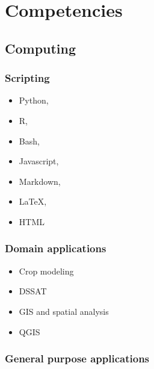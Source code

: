 \documentclass[11pt, a4paper]{awesome-cv}
\begin{document}
\hypertarget{competencies}{%
\section{Competencies}\label{competencies}}

\hypertarget{computing}{%
\subsection{Computing}\label{computing}}

\hypertarget{scripting}{%
\subsubsection*{Scripting}\label{scripting}}

\begin{multicols}{2}
\begin{itemize}
\item Python, 
\item R, 
\item Bash,
\item Javascript,
\item Markdown,
\item \LaTeX,
\item HTML
\end{itemize}
\end{multicols}

\hypertarget{domain-applications}{%
\subsubsection*{Domain applications}\label{domain-applications}}

\begin{multicols}{2}
\begin{itemize}
\item Crop modeling
\item DSSAT
\item GIS and spatial analysis
\item QGIS
\end{itemize}
\end{multicols}

\hypertarget{general-purpose-applications}{%
\subsubsection*{General purpose
applications}\label{general-purpose-applications}}
\end{document}
